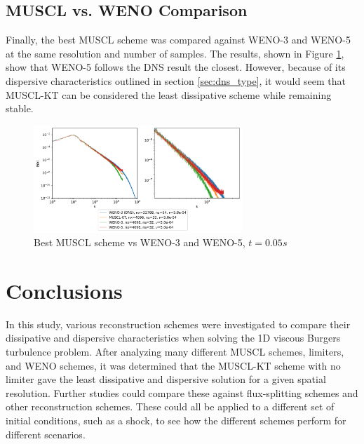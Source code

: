 \documentclass[conf]{new-aiaa}
\begin{document}


\subsection{MUSCL vs. WENO Comparison} \label{sec:muscl_vs_weno}

Finally, the best MUSCL scheme was compared against WENO-3 and WENO-5 at the
same resolution and number of samples. The results, shown in Figure
\ref{fig:best_muscl_vs_weno}, show that WENO-5 follows the DNS result the
closest. However, because of its dispersive characteristics outlined in section
\ref{sec:dns_type}, it would seem that MUSCL-KT can be considered the least
dissipative scheme while remaining stable.

\begin{figure}[hbt!]
	\centering
	\includegraphics[width=0.7\textwidth]{figures/Best_MUSCL_vs_WENO_35_Ek_vs_k.png}
	\caption{Best MUSCL scheme vs WENO-3 and WENO-5, $t=0.05s$}
	\label{fig:best_muscl_vs_weno}
\end{figure}

\section{Conclusions}
In this study, various reconstruction schemes were investigated to compare
their dissipative and dispersive characteristics when solving the 1D viscous
Burgers turbulence problem. After analyzing many different MUSCL schemes,
limiters, and WENO schemes, it was determined that the MUSCL-KT scheme with no
limiter gave the least dissipative and dispersive solution for a given spatial
resolution. Further studies could compare these against flux-splitting schemes
and other reconstruction schemes. These could all be applied to a different set
of initial conditions, such as a shock, to see how the different schemes
perform for different scenarios.

\newpage


\end{document}
